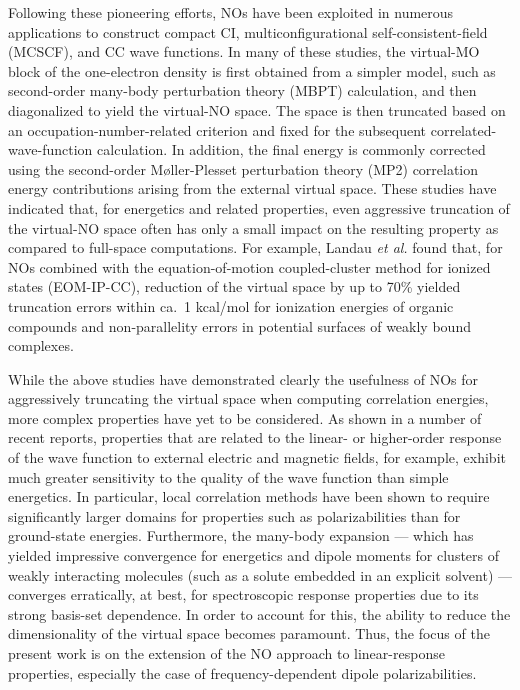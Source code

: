 Following these pioneering efforts, NOs have been exploited in numerous
applications to construct compact CI\cite{Abrams04,Fermann94,Sherrill98:CI},
multiconfigurational self-consistent-field (MCSCF)\cite{Jensen88}, and CC wave
functions\cite{DePrince13,DePrince13:FNOs,Landau10,Sosa89,Taube05,Taube08}. In
many of these studies, the virtual-MO block of the one-electron density is
first obtained from a simpler model, such as second-order many-body
perturbation theory (MBPT) calculation, and then diagonalized to yield the
virtual-NO space.  The space is then truncated based on an
occupation-number-related criterion and fixed for the subsequent
correlated-wave-function calculation.  In addition, the final energy is
commonly corrected using the second-order M\o ller-Plesset perturbation theory
(MP2) correlation energy contributions arising from the external virtual
space.  These studies have indicated that, for energetics and related
properties, even aggressive truncation of the virtual-NO space often has only
a small impact on the resulting property as compared to full-space
computations.  For example, Landau {\em et al.}\cite{Landau10} found that,
for NOs
combined with the equation-of-motion coupled-cluster method for ionized states
(EOM-IP-CC), reduction of the virtual space by up to 70\% yielded truncation
errors within ca.\ 1 kcal/mol for ionization energies of organic compounds and
non-parallelity errors in potential surfaces of weakly bound complexes.

While the above studies have demonstrated clearly the usefulness of NOs for
aggressively truncating the virtual space when computing correlation energies,
more complex properties have yet to be considered.  As shown in a number of
recent reports\cite{Friedrich15,Korona04,McAlexander15:LRCC,McAlexander12,Russ04,Russ08},
properties that are related to the linear- or higher-order response of the
wave function to external electric and magnetic fields, for example, exhibit
much greater sensitivity to the quality of the wave function than simple
energetics.  In particular, local correlation methods have been
shown\cite{Korona04,McAlexander15:LRCC,McAlexander12,Russ04,Russ08} to
require significantly larger domains for properties such as polarizabilities
than for ground-state energies.  Furthermore, the many-body expansion ---
which has yielded impressive convergence for energetics and dipole moments for
clusters of weakly interacting molecules (such as a solute embedded in an
explicit solvent) --- converges erratically, at best, for spectroscopic
response properties due to its strong basis-set dependence.\cite{Mach14}
In order to account for this, the ability to reduce the dimensionality
of the virtual space becomes paramount.  Thus, the focus of the present
work is on the extension of the NO approach to linear-response
properties, especially the case of frequency-dependent dipole
polarizabilities.

